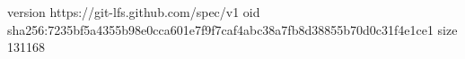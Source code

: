 version https://git-lfs.github.com/spec/v1
oid sha256:7235bf5a4355b98e0cca601e7f9f7caf4abc38a7fb8d38855b70d0c31f4e1ce1
size 131168

